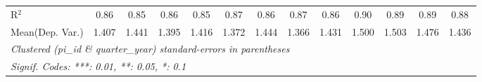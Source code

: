 \begin{tabular}{lcccccccccccc}
   R$^2$                                                      & 0.86          & 0.85          & 0.86          & 0.85          & 0.87         & 0.86          & 0.87         & 0.86          & 0.90         & 0.89         & 0.89          & 0.88\\  
Mean(Dep. Var.) & 1.407 & 1.441 & 1.395 & 1.416 & 1.372 & 1.444 & 1.366 & 1.431 & 1.500 & 1.503 & 1.476 & 1.436 \\
   \midrule \midrule
   \multicolumn{13}{l}{\emph{Clustered (pi\_id \& quarter\_year) standard-errors in parentheses}}\\
   \multicolumn{13}{l}{\emph{Signif. Codes: ***: 0.01, **: 0.05, *: 0.1}}\\
\end{tabular}
\par\endgroup
